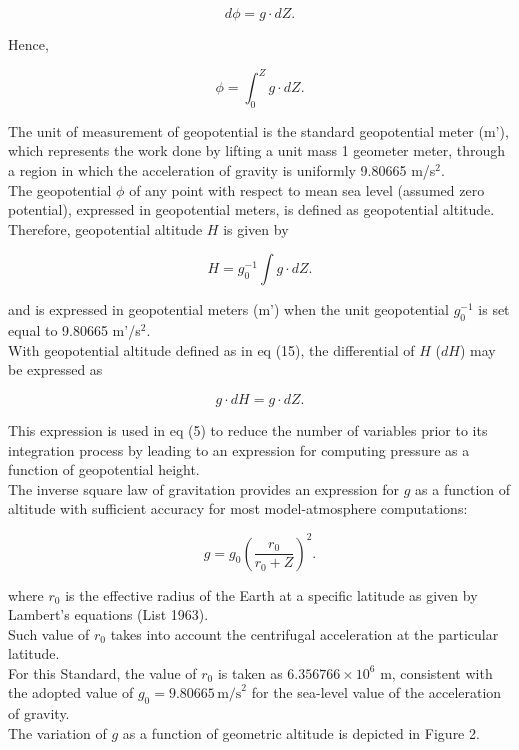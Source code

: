\documentclass{article}
\begin{document}
\begin{equation}
 d\phi = g \cdot dZ. \tag{13}
\end{equation}

Hence,

\begin{equation}
 \phi = \int_{0}^{Z} g \cdot dZ . \tag{14}
\end{equation}

The unit of measurement of geopotential is the standard geopotential meter (m'), which represents the work done by lifting a unit mass 1 geometer meter, through a region in which the acceleration of gravity is uniformly 9.80665 m/s\(^2\). \\

The geopotential \(\phi\) of any point with respect to mean sea level (assumed zero potential), expressed in geopotential meters, is defined as geopotential altitude. \\
Therefore, geopotential altitude \(H\) is given by

\begin{equation}
 H = g_0^{-1} \int g \cdot dZ. \tag{15}
\end{equation}

and is expressed in geopotential meters (m') when the unit geopotential \(g_0^{-1}\) is set equal to 9.80665 m'/s\(^2\). \\

With geopotential altitude defined as in eq (15), the differential of \(H\) (\(dH\)) may be expressed as

\begin{equation}
 g\cdot dH = g\cdot dZ. \tag{16}
\end{equation}

This expression is used in eq (5) to reduce the number of variables prior to its integration process by leading to an expression for computing pressure as a function of geopotential height. \\

The inverse square law of gravitation provides an expression for \(g\) as a function of altitude with sufficient accuracy for most model-atmosphere computations:

\begin{equation}
 g = g_0 \left( \frac{r_0}{r_0 + Z} \right)^2. \tag{17}
\end{equation}

where \(r_0\) is the effective radius of the Earth at a specific latitude as given by Lambert's equations (List 1963). \\
Such value of \(r_0\) takes into account the centrifugal acceleration at the particular latitude. \\
For this Standard, the value of \(r_0\) is taken as \(6.356766 \times 10^6\) m, consistent with the adopted value of \(g_0 = 9.80665 \, \text{m/s}^2\) for the sea-level value of the acceleration of gravity. \\
The variation of \(g\) as a function of geometric altitude is depicted in Figure 2.
\end{document}
